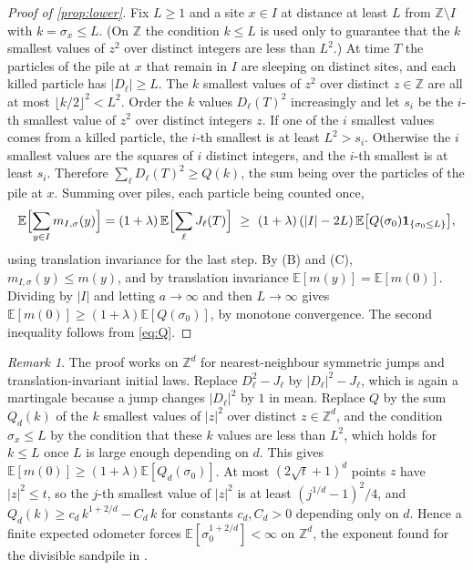 \documentclass[11pt]{article}
\theoremstyle{remark}
\newtheorem{remark}[theorem]{Remark}
\newcommand{\Z}{\mathbb Z}
\newcommand{\E}{\mathbb E}
\newcommand{\1}{\mathbf 1}
\begin{document}
\begin{proof}[Proof of \cref{prop:lower}]
Fix $L\ge1$ and a site $x\in I$ at distance at least $L$ from $\Z\setminus I$ with $k=\sigma_x\le L$. (On $\Z$ the condition $k\le L$ is used only to guarantee that the $k$ smallest values of $z^2$ over distinct integers are less than $L^2$.) At time $T$ the particles of the pile at $x$ that remain in $I$ are sleeping on distinct sites, and each killed particle has $|D_\ell|\ge L$. The $k$ smallest values of $z^2$ over distinct $z\in\Z$ are all at most $\lfloor k/2\rfloor^2<L^2$. Order the $k$ values $D_\ell(T)^2$ increasingly and let $s_i$ be the $i$-th smallest value of $z^2$ over distinct integers $z$. If one of the $i$ smallest values comes from a killed particle, the $i$-th smallest is at least $L^2>s_i$. Otherwise the $i$ smallest values are the squares of $i$ distinct integers, and the $i$-th smallest is at least $s_i$. Therefore $\sum_\ell D_\ell(T)^2\ge Q(k)$, the sum being over the particles of the pile at $x$. Summing over piles, each particle being counted once,
\[
\E\Bigl[\sum_{y\in I}m_{I,\sigma}(y)\Bigr]=(1+\lambda)\,\E\Bigl[\sum_\ell J_\ell(T)\Bigr]\ \ge\ (1+\lambda)\,(|I|-2L)\,\E\bigl[Q(\sigma_0)\1_{\{\sigma_0\le L\}}\bigr],
\]
using translation invariance for the last step. By (B) and (C), $m_{I,\sigma}(y)\le m(y)$, and by translation invariance $\E[m(y)]=\E[m(0)]$. Dividing by $|I|$ and letting $a\to\infty$ and then $L\to\infty$ gives $\E[m(0)]\ge(1+\lambda)\E[Q(\sigma_0)]$, by monotone convergence. The second inequality follows from \eqref{eq:Q}.
\end{proof}

\begin{remark}
The proof works on $\Z^d$ for nearest-neighbour symmetric jumps and translation-invariant initial laws. Replace $D_\ell^2-J_\ell$ by $|D_\ell|^2-J_\ell$, which is again a martingale because a jump changes $|D_\ell|^2$ by $1$ in mean. Replace $Q$ by the sum $Q_d(k)$ of the $k$ smallest values of $|z|^2$ over distinct $z\in\Z^d$, and the condition $\sigma_x\le L$ by the condition that these $k$ values are less than $L^2$, which holds for $k\le L$ once $L$ is large enough depending on $d$. This gives $\E[m(0)]\ge(1+\lambda)\E[Q_d(\sigma_0)]$. At most $(2\sqrt t+1)^d$ points $z$ have $|z|^2\le t$, so the $j$-th smallest value of $|z|^2$ is at least $(j^{1/d}-1)^2/4$, and $Q_d(k)\ge c_d\,k^{1+2/d}-C_d\,k$ for constants $c_d,C_d>0$ depending only on $d$. Hence a finite expected odometer forces $\E[\sigma_0^{1+2/d}]<\infty$ on $\Z^d$, the exponent found for the divisible sandpile in \cite[Lemma~8.2]{BPS}.
\end{remark}
\end{document}
